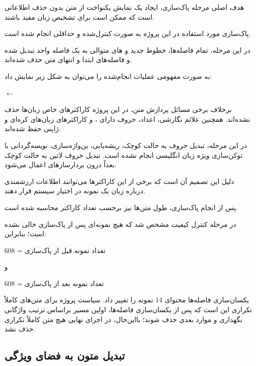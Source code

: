 \documentclass[12pt,a4paper,oneside]{report}
\begin{document}
هدف اصلی مرحله پاک‌سازی، ایجاد یک نمایش یکنواخت از متن بدون حذف اطلاعاتی است که ممکن است برای تشخیص زبان مفید باشند.

پاک‌سازی مورد استفاده در این پروژه به صورت کنترل‌شده و حداقلی انجام شده است.

در این مرحله، تمام فاصله‌ها، خطوط جدید و
های متوالی به یک فاصله واحد تبدیل شده و فاصله‌های ابتدا و انتهای متن حذف شده‌اند.

به صورت مفهومی عملیات انجام‌شده را می‌توان به شکل زیر نمایش داد:

\begin{center}
$\longleftarrow$
\end{center}

برخلاف برخی مسائل پردازش متن، در این پروژه کاراکترهای خاص زبان‌ها حذف نشده‌اند. همچنین علائم نگارشی، اعداد، حروف دارای
،
و کاراکترهای زبان‌های کره‌ای و ژاپنی حفظ شده‌اند.

در این مرحله، تبدیل حروف به حالت کوچک، ریشه‌یابی، بن‌واژه‌سازی، نویسه‌گردانی یا توکن‌سازی ویژه زبان انگلیسی انجام نشده است. تبدیل حروف لاتین به حالت کوچک بعداً درون بردارسازهای
اعمال می‌شود.

دلیل این تصمیم آن است که برخی از این کاراکترها می‌توانند اطلاعات ارزشمندی درباره زبان یک نمونه در اختیار سیستم قرار دهند.

پس از انجام پاک‌سازی، طول متن‌ها نیز برحسب تعداد کاراکتر محاسبه شده است.

در مرحله کنترل کیفیت مشخص شد که هیچ نمونه‌ای پس از پاک‌سازی خالی نشده است؛ بنابراین:

\begin{center}
تعداد نمونه قبل از پاک‌سازی = 608
\end{center}

و

\begin{center}
تعداد نمونه بعد از پاک‌سازی = 608
\end{center}

یکسان‌سازی فاصله‌ها محتوای 14 نمونه را تغییر داد. سیاست پروژه برای متن‌های کاملاً تکراری این است که پس از یکسان‌سازی فاصله‌ها، اولین مسیر براساس ترتیب واژگانی نگهداری و موارد بعدی حذف شوند؛ بااین‌حال، در اجرای نهایی هیچ متن کاملاً تکراری حذف نشد.


\subsection{تبدیل متون به فضای ویژگی}
\end{document}
